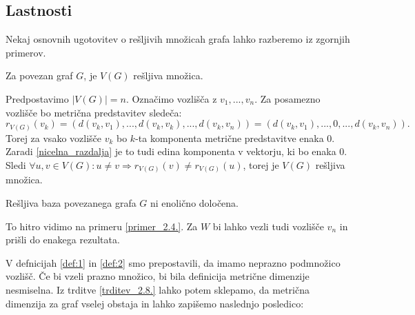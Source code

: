 \documentclass[mat1, tisk]{fmfdelo}
\begin{document}
\subsection{Lastnosti}

Nekaj osnovnih ugotovitev o rešljivih množicah grafa lahko razberemo iz zgornjih primerov.

\begin{trditev} \label{trditev_2.8.}
Za povezan graf $G$, je $V(G)$ rešljiva množica.
\end{trditev}

\begin{dokaz}
Predpostavimo $|V(G)|= n$. Označimo vozlišča z $v_1, ..., v_n$.
Za posamezno vozlišče bo metrična predstavitev sledeča:
$$r_{V(G)}(v_k) = (d(v_k, v_1), ..., d(v_k, v_k), ... , d(v_k, v_n)) = (d(v_k, v_1), ..., 0 , ... , d(v_k, v_n)).$$
Torej za vsako vozlišče $v_k$ bo $k$-ta komponenta metrične predstavitve enaka $0$. 
Zaradi \ref{nicelna_razdalja} je to tudi edina komponenta v vektorju, ki bo enaka $0$.
Sledi $\forall u, v \in V(G): u \neq v \Rightarrow r_{V(G)}(v) \neq r_{V(G)}(u)$, 
torej je $V(G)$ rešljiva množica.
\end{dokaz}


\begin{trditev}
    Rešljiva baza povezanega grafa $G$ ni enolično določena.
\end{trditev}
\begin{dokaz}
    To hitro vidimo na primeru \ref{primer_2.4.}.
    Za $W$ bi lahko vezli tudi vozlišče $v_n$ in prišli do enakega rezultata.
\end{dokaz}

V defnicijah \ref{def:1} in \ref{def:2} smo prepostavili, da imamo neprazno podmnožico 
vozlišč. Če bi vzeli prazno množico, bi bila definicija metrične dimenzije nesmiselna. 
Iz trditve \ref{trditev_2.8.} lahko potem sklepamo, da metrična dimenzija za graf vselej 
obstaja in lahko zapišemo naslednjo posledico:
\end{document}
